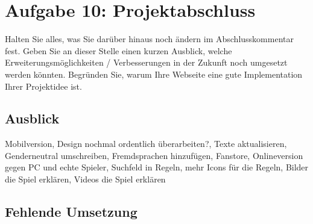 \documentclass{scrartcl}
\begin{document}
\section*{Aufgabe 10: Projektabschluss}
 Halten Sie alles, was Sie darüber hinaus noch ändern im Abschlusskommentar fest. Geben Sie
an dieser Stelle einen kurzen Ausblick, welche Erweiterungsmöglichkeiten / Verbesserungen in
der Zukunft noch umgesetzt werden könnten. Begründen Sie, warum Ihre Webseite eine gute
Implementation Ihrer Projektidee ist.
 \subsection*{Ausblick} 
 Mobilversion, Design nochmal ordentlich überarbeiten?, Texte aktualisieren, Genderneutral umschreiben, Fremdsprachen hinzufügen,
 Fanstore, Onlineversion gegen PC und echte Spieler, Suchfeld in Regeln, mehr Icons für die Regeln, Bilder die Spiel erklären, Videos die Spiel erklären
 \subsection*{Fehlende Umsetzung}
\end{document}
